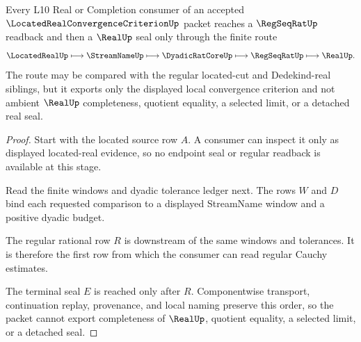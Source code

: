 \begin{theorem}
\label{thm:located-real-convergence-criterion-regular-readback}
Every L10 Real or Completion consumer of an accepted $\LocatedRealConvergenceCriterionUp$ packet reaches a $\RegSeqRatUp$ readback and then a $\RealUp$ seal only through the finite route
$$
\LocatedRealUp \longmapsto \StreamNameUp \longmapsto \DyadicRatCoreUp \longmapsto \RegSeqRatUp \longmapsto \RealUp .
$$
The route may be compared with the regular located-cut and Dedekind-real siblings, but it exports only the displayed local convergence criterion and not ambient $\RealUp$ completeness, quotient equality, a selected limit, or a detached real seal.
\end{theorem}
\begin{proof}
Start with the located source row $A$. A consumer can inspect it only as displayed located-real evidence, so no endpoint seal or regular readback is available at this stage.

Read the finite windows and dyadic tolerance ledger next. The rows $W$ and $D$ bind each requested comparison to a displayed StreamName window and a positive dyadic budget.

The regular rational row $R$ is downstream of the same windows and tolerances. It is therefore the first row from which the consumer can read regular Cauchy estimates.

The terminal seal $E$ is reached only after $R$. Componentwise transport, continuation replay, provenance, and local naming preserve this order, so the packet cannot export completeness of $\RealUp$, quotient equality, a selected limit, or a detached seal.
\end{proof}



